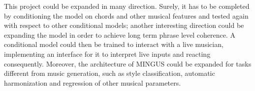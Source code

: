 \documentclass{article}
\begin{document}
This project could be expanded in many direction. Surely, it has to be completed by conditioning the model on chords and other musical features and tested again with respect to other conditional models; another interesting direction could be expanding the model in order to achieve long term phrase level coherence. A conditional model could then be trained to interact with a live musician, implementing an interface for it to interpret live inputs and reacting consequently. Moreover, the architecture of MINGUS could be expanded for tasks different from music generation, such as style classification, automatic harmonization and regression of other musical parameters.

\newpage


\end{document}

